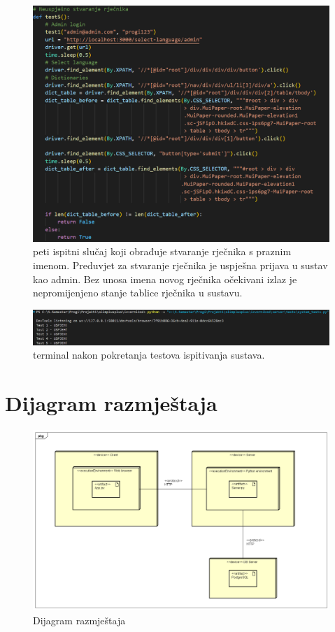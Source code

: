 \begin{figure}[htp]
    \caption{peti ispitni slučaj koji obrađuje stvaranje rječnika s praznim imenom. Preduvjet za stvaranje rječnika je uspješna prijava u sustav kao admin. Bez unosa imena novog rječnika očekivani izlaz je nepromijenjeno stanje tablice rječnika u sustavu.}
    \includegraphics[scale=0.5]{dijagrami/test5.png}
    \centering
    
\end{figure}
\break

\begin{figure}[htp]
    \caption{terminal nakon pokretanja testova ispitivanja sustava.}
    \includegraphics[scale=0.4]{dijagrami/terminal_screen.png}
    \centering
    
\end{figure}
\eject

		
		\section{Dijagram razmještaja}
			
		\begin{figure}[htp]
			\includegraphics[scale=0.4]{dijagrami/DeploymentDiagram0.png}
			\centering
			\caption{Dijagram razmještaja}
		\end{figure}
		
